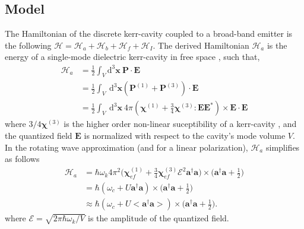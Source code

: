 \documentclass[12pt]{article}
\begin{document}
\subsection{Model}
The Hamiltonian of the discrete kerr-cavity coupled to a broad-band emitter is
the following $\mathcal{H} = \mathcal{H}_{a} + \mathcal{H}_{b} + 
\mathcal{H}_{f} + \mathcal{H}_{I}$. The derived Hamiltonian $\mathcal{H}_{a}$ 
is the energy of a single-mode dielectric kerr-cavity in free space 
\cite{jackson1999classical}, such that,
\begin{equation}
\begin{split}
\mathcal{H}_{a} &= \frac{1}{2} 
    \int_{V} \mathrm{d}^{3}\mathbf{x} \: \mathbf{P} \cdot \mathbf{E}
\\
&= \frac{1}{2} 
    \int_{V} \: \mathrm{d}^{3}\mathbf{x} (\mathbf{P}^{(1)} + \mathbf{P}^{(3)})
    \cdot \mathbf{E}
\\
&= \frac{1}{2} 
    \int_{V} \: \mathrm{d}^{3}\mathbf{x} \: 4\pi 
    (\mathbf{\chi}^{(1)} + 
    \frac{3}{4}\mathbf{\chi}^{(3)}:\mathbf{E}\mathbf{E}^{*})
    \times \mathbf{E} \cdot \mathbf{E}
\end{split}
\end{equation}
where $3/4\mathbf{\chi}^{(3)}$ is the higher order non-linear suceptibility of
a kerr-cavity \cite{butcher1990elements}, and the quantized field $\mathbf{E}$
is normalized with respect to the cavity's mode volume $V$. In the rotating
wave approximation (and for a linear polarization), $\mathcal{H}_{a}$
simplifies as follows
\begin{equation}
\begin{split}
\mathcal{H}_{a} &= \hbar\omega_k 4\pi^{2} \Big(
    \mathbf{\chi}^{(1)}_{ef} +
    \frac{3}{4} \mathbf{\chi}^{(3)}_{ef} \mathcal{E}^2
    \mathbf{a}^{\dagger}\mathbf{a} \Big)
    \times \Big( \mathbf{a}^{\dagger}\mathbf{a} + \frac{1}{2} \Big)
\\
&= \hbar( \omega_c + U\mathbf{a}^{\dagger}\mathbf{a} )
    \times \Big( \mathbf{a}^{\dagger}\mathbf{a} + \frac{1}{2} \Big)
\\  
&\approx \hbar( \omega_c + U < \mathbf{a}^{\dagger}\mathbf{a}> )
    \times \Big( \mathbf{a}^{\dagger}\mathbf{a} + \frac{1}{2} \Big).
\end{split}
\end{equation}
where $\mathcal{E} = \sqrt{2\pi \hbar \omega_k / V }$ is the amplitude of the
quantized field.
\end{document}
